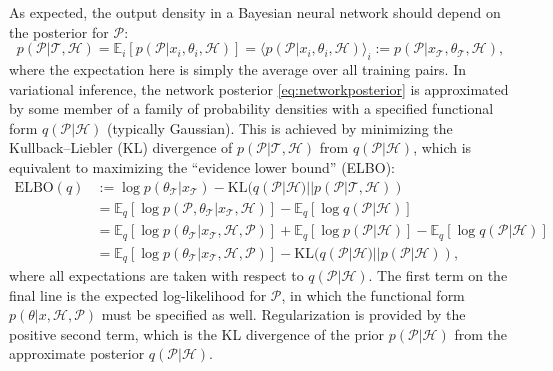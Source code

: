 \documentclass[aps,notitlepage,onecolumn]{revtex4-1}
\begin{document}
As expected, the output density in a Bayesian neural network should depend on the posterior for $\mathcal{P}$:
\begin{equation}\label{eq:networkposterior}
p(\mathcal{P}|\mathcal{T},\mathcal{H})=\mathbb{E}_i[p(\mathcal{P}|x_i,\theta_i,\mathcal{H})]=\langle p(\mathcal{P}|x_i,\theta_i,\mathcal{H})\rangle_i:=p(\mathcal{P}|x_\mathcal{T},\theta_\mathcal{T},\mathcal{H}),
\end{equation}
where the expectation here is simply the average over all training pairs. In variational inference, the network posterior \eqref{eq:networkposterior} is approximated by some member of a family of probability densities with a specified functional form $q(\mathcal{P}|\mathcal{H})$ (typically Gaussian). This is achieved by minimizing the Kullback--Liebler (KL) divergence of $p(\mathcal{P}|\mathcal{T},\mathcal{H})$ from $q(\mathcal{P}|\mathcal{H})$, which is equivalent to maximizing the ``evidence lower bound'' (ELBO):
\begin{align}
\mathrm{ELBO}(q)&:=\log{p(\theta_\mathcal{T}|x_\mathcal{T})-\mathrm{KL}(q(\mathcal{P}|\mathcal{H})||p(\mathcal{P}|\mathcal{T},\mathcal{H}))}\nonumber\\
&=\mathbb{E}_q[\log{p(\mathcal{P},\theta_\mathcal{T}|x_\mathcal{T},\mathcal{H})}]-\mathbb{E}_q[\log{q(\mathcal{P}|\mathcal{H})}]\nonumber\\
&=\mathbb{E}_q[\log{p(\theta_\mathcal{T}|x_\mathcal{T},\mathcal{H},\mathcal{P})}]+\mathbb{E}_q[\log{p(\mathcal{P}|\mathcal{H})}]-\mathbb{E}_q[\log{q(\mathcal{P}|\mathcal{H})}]\nonumber\\
&=\mathbb{E}_q[\log{p(\theta_\mathcal{T}|x_\mathcal{T},\mathcal{H},\mathcal{P})}]-\mathrm{KL}(q(\mathcal{P}|\mathcal{H})||p(\mathcal{P}|\mathcal{H})),
\end{align}
where all expectations are taken with respect to $q(\mathcal{P}|\mathcal{H})$. The first term on the final line is the expected log-likelihood for $\mathcal{P}$, in which the functional form $p(\theta|x,\mathcal{H},\mathcal{P})$ must be specified as well. Regularization is provided by the positive second term, which is the KL divergence of the prior $p(\mathcal{P}|\mathcal{H})$ from the approximate posterior $q(\mathcal{P}|\mathcal{H})$.
\end{document}
